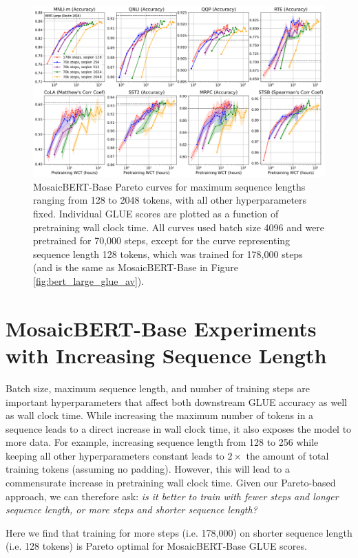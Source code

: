\begin{figure}[h!]
    \centering
    \includegraphics[width=1\textwidth]{figures/seqlen-glue-individual-1-15-823pm.png}
    \caption{MosaicBERT-Base Pareto curves for maximum sequence lengths ranging from 128 to 2048 tokens, with all other hyperparameters fixed. Individual GLUE scores are plotted as a function of pretraining wall clock time. All curves used batch size 4096 and were pretrained for 70,000 steps, except for the curve representing sequence length 128 tokens, which was trained for 178,000 steps (and is the same as MosaicBERT-Base in Figure \ref{fig:bert_large_glue_av}).}
    \label{fig:mosaicbert-base-seqlen-individual}
\end{figure}

\section{MosaicBERT-Base Experiments with Increasing Sequence Length}

Batch size, maximum sequence length, and number of training steps are important hyperparameters that affect both downstream GLUE accuracy as well as wall clock time. While increasing the maximum number of tokens in a sequence leads to a direct increase in wall clock time, it also exposes the model to more data. For example, increasing sequence length from 128 to 256 while keeping all other hyperparameters constant leads to $2\times$ the amount of total training tokens (assuming no padding). However, this will lead to a commensurate increase in pretraining wall clock time. Given our Pareto-based approach, we can therefore ask:\textit{ is it better to train with fewer steps and longer sequence length, or more steps and shorter sequence length? }

Here we find that training for more steps (i.e. 178,000) on shorter sequence length (i.e. 128 tokens) is Pareto optimal for MosaicBERT-Base GLUE scores. 

